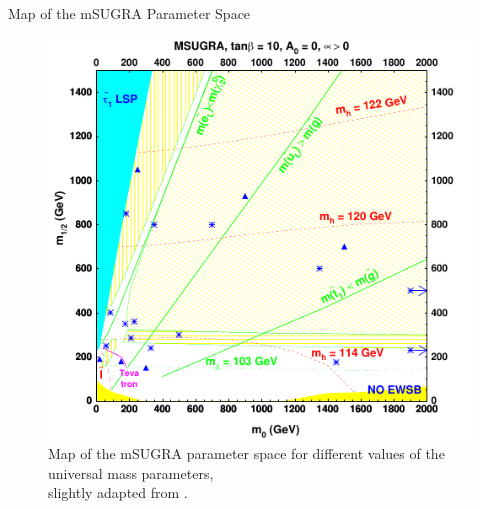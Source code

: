 \begin{frame}{Map of the mSUGRA Parameter Space}
	\begin{figure}
	\centering
	\includegraphics[scale = 0.85]{figures/parameter_space_mod}
	\caption{Map of the mSUGRA parameter space for different values of the universal mass parameters, \\ slightly adapted from \cite{CMS2007}.}
	\end{figure}
\end{frame}